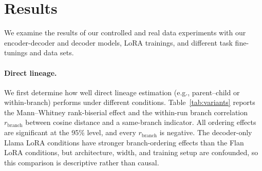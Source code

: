 \documentclass{article}
\theoremstyle{definition}
\theoremstyle{plain}
\begin{document}
\section{Results}
\label{sec:results}


We examine the results of our controlled and real data experiments with our encoder-decoder and decoder models, LoRA trainings, and different task fine-tunings and data sets.


\paragraph{Direct lineage.}
We first determine how well direct lineage estimation (e.g., parent--child or within-branch) performs under different conditions. Table~\ref{tab:variants} reports the Mann--Whitney rank-biserial effect and the within-run branch correlation $r_{\mathrm{branch}}$ between cosine distance and a same-branch indicator. All ordering effects are significant at the 95\% level, and every $r_{\mathrm{branch}}$ is negative. The decoder-only Llama LoRA conditions have stronger branch-ordering effects than the Flan LoRA conditions, but architecture, width, and training setup are confounded, so this comparison is descriptive rather than causal.
\end{document}
